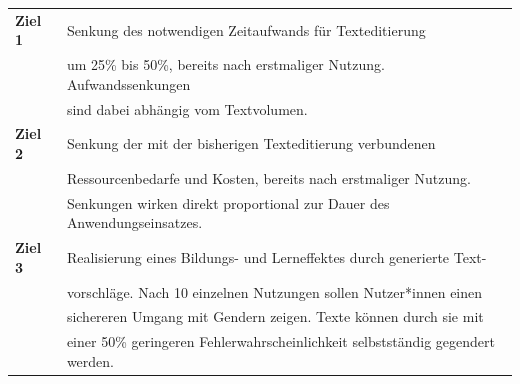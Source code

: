 \documentclass[paper=a4, parskip=half]{scrreprt}
\begin{document}
\begin{table}[!htb]
\begin{tabular}{ll}
\textbf{Ziel 1} & Senkung des notwendigen Zeitaufwands für Texteditierung \\
 & um 25\% bis 50\%, bereits nach erstmaliger Nutzung. Aufwandssenkungen \\
 & sind dabei abhängig vom Textvolumen. \vspace{0.15cm} \\
\textbf{Ziel 2} & Senkung der mit der bisherigen Texteditierung verbundenen \\
 & Ressourcenbedarfe und Kosten, bereits nach erstmaliger Nutzung. \\
 & Senkungen wirken direkt proportional zur Dauer des Anwendungseinsatzes. \vspace{0.15cm} \\
\textbf{Ziel 3} & Realisierung eines Bildungs- und Lerneffektes durch generierte Text-\\
& vorschläge. Nach 10 einzelnen Nutzungen sollen Nutzer*innen einen\\
& sichereren Umgang mit Gendern zeigen. Texte können durch sie mit\\
& einer 50\% geringeren Fehlerwahrscheinlichkeit selbstständig gegendert werden.\\

\end{tabular}
\end{table}
\end{document}
